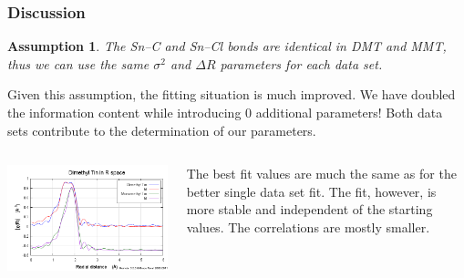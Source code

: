 \documentclass[10pt, xcolor=x11names, compress, handout]{beamer}
\begin{document}
\newtheorem{assumption}[theorem]{Assumption}

\begin{frame}
  \frametitle{Discussion}
  \begin{assumption}
    The Sn--C and Sn--Cl bonds are identical in DMT and MMT, thus we
    can use the same $\sigma^2$ and $\Delta R$ parameters for each
    data set.
  \end{assumption}

  Given this assumption, the fitting situation is much improved.  We
  have \alert{doubled} the information content while introducing
  \alert{0} additional parameters!  Both data sets contribute to the
  determination of our {\guessp} parameters.

  \begin{columns}
    \begin{column}{0.5\linewidth}
      \includegraphics[width=\linewidth]{images/MDS_fit.png}
    \end{column}
    \begin{column}{0.5\linewidth}
      The best fit values are much the same as for the better single
      data set fit.  The fit, however, is more stable and independent
      of the starting values.  The correlations are mostly smaller.
    \end{column}
  \end{columns}
\end{frame}
\end{document}
